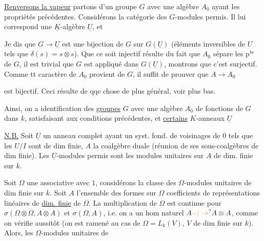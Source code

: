 \uline{Renversons la vapeur} partons d'un groupe
$G$ avec une algèbre $A_0$ ayant les propriétés
précédentes. Considérons la catégorie des
$G$-modules permis. Il lui correspond
une $\underline K$-algèbre $\underline U$, et

Je dis que $G\to\underline U$ est une bijection
de $G$ sur  $G(\underline U)$ (éléments inversibles
de $U$ tels que $\delta(s)=s\otimes s$). Que ce
soit injectif résulte du fait que $A_0$
sépare les $\mathrm p^{\mathrm{ts}}$ de $G$, il est trivial que $G$
est appliqué dans $G(\underline U)$,  montrons que
c'est surjectif. Comme tt caractère de $A_0$
provient de $G$, il suffit de prouver que $A\to A_0$

est bijectif. Ceci résulte de qqe chose de
plus général, voir plus bas.

Ainsi, on a identification des \uline{groupes} $G$
avec une algèbre $A_0$ de fonctions de $G$ dans $k$,
satisfaisant aux conditions précédentes, et
\uline{certains}  $K$-anneaux $\underline U$

\uline{N.B.} Soit $\underline U$ un anneau  
complet ayant un syst. fond. de
voisinages de $0$  tels que les $U/I$ sont
de dim finie, $A$ la coalgèbre duale
(réunion  de ses sous-coalgèbres de
dim finie). Les $\underline U$-modules
permis sont les modules unitaires
sur $A$ de dim. finie sur $k$.

Soit $\Omega$ une   associative avec
$1$, considérons la classe des $\Omega$-modules
unitaires  de dim finie sur $k$.
Soit $A$ l'ensemble des formes sur $\Omega$
coefficients de représentations linéaires
de \uline{dim. finie} de $\Omega$. La multiplication
de $\Omega$ est continue pour $\sigma(\Omega\otimes\Omega,A\otimes A)$
et $\sigma(\Omega,A)$, i.e. on a un
hom naturel $A\unsure{-|\to} A\otimes A$, comme
on vérifie aussitôt (on est ramené
au cas de $\Omega=L_{k}(V)$, $V$ de dim
finie sur $k$).
Alors, les $\Omega$-modules
unitaires   de

